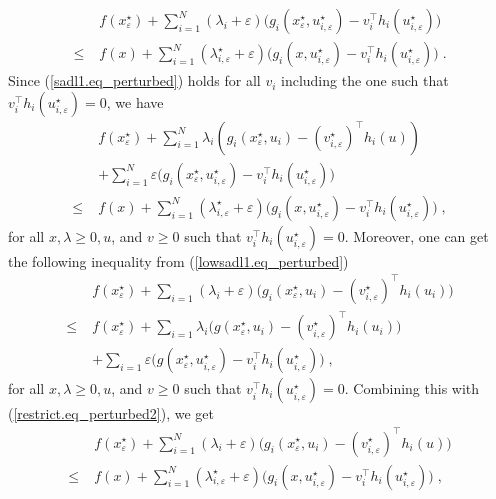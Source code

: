 \documentclass[journal,twoside,web]{ieeecolor}
\begin{document}
\begin{align*}
&f(x_\varepsilon^\star)+\sum_{i=1}^N (\lambda_i+\varepsilon) \big(g_i(x_\varepsilon^\star,u_{i,\varepsilon}^\star)-v_i^\top h_i(u_{i,\varepsilon}^\star)\big)\\
\leq \; &f(x)+\sum_{i=1}^N (\lambda_{i,\varepsilon}^\star+\varepsilon) \big(g_i(x,u_{i,\varepsilon}^\star)-v_i^\top h_i(u_{i,\varepsilon}^\star)\big)\;.
\end{align*}
Since (\ref{sadl1.eq_perturbed}) holds for all $v_i$ including the one such that $v_i^\top h_i(u_{i,\varepsilon}^\star)=0$, we have
\begin{align}
&f(x_\varepsilon^\star)+\sum_{i=1}
^N\lambda_i(g_i(x_\varepsilon^\star,u_i)- (v_{i,\varepsilon}^\star)^\top h_i(u)) \nonumber\\
&+\sum_{i=1}^N \varepsilon \big(g_i(x_\varepsilon^\star,u_{i,\varepsilon}^\star)-v_i^\top h_i(u_{i,\varepsilon}^\star)\big)\nonumber\\
\leq \; &f(x)+\sum_{i=1}^N (\lambda_{i,\varepsilon}^\star+\varepsilon) \big(g_i(x,u_{i,\varepsilon}^\star)-v_i^\top h_i(u_{i,\varepsilon}^\star)\big)\label{restrict.eq_perturbed2}\;,
\end{align}
for all $x,\lambda\geq 0,u$, and $v\geq 0$ such that $v_i^\top h_i(u_{i,\varepsilon}^\star)=0$\;. Moreover, one can get the following inequality from (\ref{lowsadl1.eq_perturbed})
\begin{align*}
&f(x_\varepsilon^\star)+\sum_{i=1} (\lambda_i+\varepsilon) \big(g_i(x_\varepsilon^\star,u_i)-(v_{i,\varepsilon}^\star)^\top h_i(u_i)\big)\\
\leq \; &f(x_\varepsilon^\star)+\sum_{i=1} \lambda_i \big(g(x_\varepsilon^\star,u_i)-(v_{i,\varepsilon}^\star)^\top h_i(u_i)\big)\\
&+\sum_{i=1} \varepsilon \big(g(x_\varepsilon^\star,u_{i,\varepsilon}^\star)-v_i^\top h_i(u_{i,\varepsilon}^\star)\big)\;,
\end{align*}
for all $x,\lambda\geq 0,u$, and $v\geq 0$ such that $v_i^\top h_i(u_{i,\varepsilon}^\star)=0$\;. Combining this with (\ref{restrict.eq_perturbed2}), we get
\begin{align}
&f(x_\varepsilon^\star)+\sum_{i=1}^N (\lambda_i+\varepsilon)\big(g_i(x_\varepsilon^\star,u_i)- (v_{i,\varepsilon}^\star)^\top h_i(u)\big) \nonumber\\
\leq \; &f(x)+\sum_{i=1}^N (\lambda_{i,\varepsilon}^\star+\varepsilon) \big(g_i(x,u_{i,\varepsilon}^\star)-v_i^\top h_i(u_{i,\varepsilon}^\star)\big)\label{restrict.eq_perturbed}\;,
\end{align}
\end{document}
